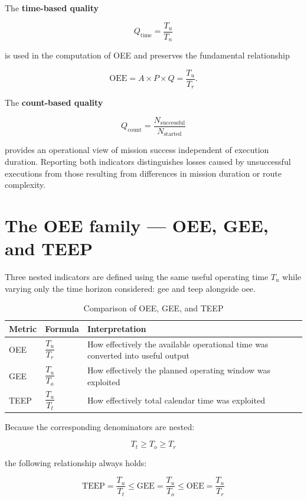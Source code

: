 The \textbf{time-based quality}

\[
Q_{\mathrm{time}} = \frac{T_u}{T_n}
\]

is used in the computation of OEE and preserves the fundamental relationship

\[
\mathrm{OEE} = A \times P \times Q = \frac{T_u}{T_r}.
\]

The \textbf{count-based quality}

\[
Q_{\mathrm{count}} = \frac{N_{\mathrm{successful}}}{N_{\mathrm{started}}}
\]

provides an operational view of mission success independent of execution duration. Reporting both indicators distinguishes losses caused by unsuccessful executions from those resulting from differences in mission duration or route complexity.

\section{The OEE family --- OEE, GEE, and TEEP}

Three nested indicators are defined using the same useful operating time $T_u$ while varying only the time horizon considered: \gls{gee} and \gls{teep} alongside \gls{oee}.

\begin{table}[H]
\small
\renewcommand{\arraystretch}{1.4}
\centering
\caption{Comparison of OEE, GEE, and TEEP}
\label{tab:oee-gee-teep}
\begin{tabular}{|p{2.2cm}|p{2.4cm}|p{9.0cm}|}
\hline
\textbf{Metric} & \textbf{Formula} & \textbf{Interpretation} \\
\hline
OEE & $\dfrac{T_u}{T_r}$ & How effectively the available operational time was converted into useful output \\
\hline
GEE & $\dfrac{T_u}{T_o}$ & How effectively the planned operating window was exploited \\
\hline
TEEP & $\dfrac{T_u}{T_t}$ & How effectively total calendar time was exploited \\
\hline
\end{tabular}
\end{table}

Because the corresponding denominators are nested:

\[
T_t \geq T_o \geq T_r
\]

the following relationship always holds:

\[
\mathrm{TEEP} = \frac{T_u}{T_t} \leq \mathrm{GEE} = \frac{T_u}{T_o} \leq \mathrm{OEE} = \frac{T_u}{T_r}
\]

